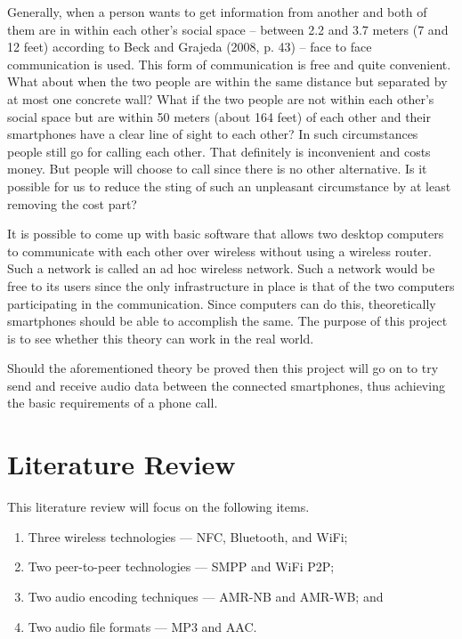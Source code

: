 \documentclass[12pt,svgnames,smaller]{article} %
\begin{document}
Generally, when a person wants to get information from another and both of them are in within each other’s social space – between 2.2 and 3.7 meters (7 and 12 feet) according to Beck and Grajeda (2008, p. 43) – face to face communication is used. This form of communication is free and quite convenient. What about when the two people are within the same distance but separated by at most one concrete wall? What if the two people are not within each other’s social space but are within 50 meters (about 164 feet) of each other and their smartphones have a clear line of sight to each other? In such circumstances people still go for calling each other. That definitely is inconvenient and costs money. But people will choose to call since there is no other alternative. Is it possible for us to reduce the sting of such an unpleasant circumstance by at least removing the cost part?

It is possible to come up with basic software that allows two desktop computers to communicate with each other over wireless without using a wireless router. Such a network is called an ad hoc wireless network. Such a network would be free to its users since the only infrastructure in place is that of the two computers participating in the communication. Since computers can do this, theoretically smartphones should be able to accomplish the same. The purpose of this project is to see whether this theory can work in the real world. 

Should the aforementioned theory be proved then this project will go on to try send and receive audio data between the connected smartphones, thus achieving the basic requirements of a phone call.


	
	\section{ \textbf{ Literature Review } } 
	
	This literature review will focus on the following items.
	
	\begin{enumerate}
		\item Three wireless technologies --- NFC, Bluetooth, and WiFi;
		\item Two peer-to-peer technologies --- SMPP and WiFi P2P;
		\item Two audio encoding techniques --- AMR-NB and AMR-WB; and
		\item Two audio file formats --- MP3 and AAC.
	\end{enumerate}
	
\end{document}
